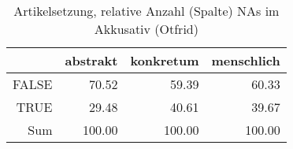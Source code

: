 \begin{table}[ht]
\centering
\begin{tabular}{rrrr}
  \hline
 & abstrakt & konkretum & menschlich \\ 
  \hline
FALSE & 70.52 & 59.39 & 60.33 \\ 
  TRUE & 29.48 & 40.61 & 39.67 \\ 
  Sum & 100.00 & 100.00 & 100.00 \\ 
   \hline
\end{tabular}
\caption{Artikelsetzung, relative Anzahl (Spalte) NAs im Akkusativ (Otfrid)} 
\end{table}

